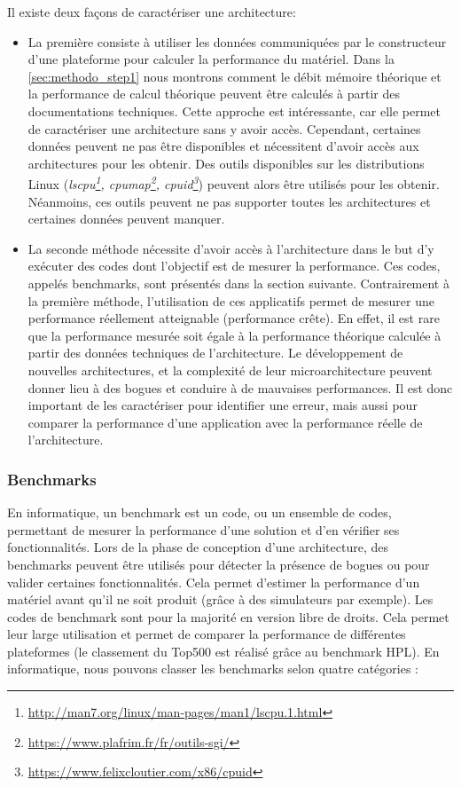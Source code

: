     Il existe deux façons de caractériser une architecture: 
    \begin{itemize}
        \item La première consiste à utiliser les données communiquées par le constructeur d'une plateforme pour calculer la performance du matériel. Dans la \autoref{sec:methodo_step1} nous montrons comment le débit mémoire théorique et la performance de calcul théorique peuvent être calculés à partir des documentations techniques. Cette approche est intéressante, car elle permet de caractériser une architecture sans y avoir accès. Cependant, certaines données peuvent ne pas être disponibles et nécessitent d'avoir accès aux architectures pour les obtenir. Des outils disponibles sur les distributions Linux (\textit{lscpu\footnote{\url{http://man7.org/linux/man-pages/man1/lscpu.1.html}}, cpumap\footnote{\url{https://www.plafrim.fr/fr/outils-sgi/}}, cpuid\footnote{\url{https://www.felixcloutier.com/x86/cpuid}}}) peuvent alors être utilisés pour les obtenir. Néanmoins, ces outils peuvent ne pas supporter toutes les architectures et certaines données peuvent manquer.
    
        \item La seconde méthode nécessite d'avoir accès à l'architecture dans le but d'y exécuter des codes dont l'objectif est de mesurer la performance. Ces codes, appelés \glspl{benchmark}, sont présentés dans la section suivante. Contrairement à la première méthode, l'utilisation de ces applicatifs permet de mesurer une performance réellement atteignable (performance crête). En effet, il est rare que la performance mesurée soit égale à la performance théorique calculée à partir des données techniques de l'architecture. Le développement de nouvelles architectures, et la complexité de leur microarchitecture peuvent donner lieu à des bogues et conduire à de mauvaises performances. Il est donc important de les caractériser pour identifier une erreur, mais aussi pour comparer la performance d'une application avec la performance réelle de l'architecture.
    \end{itemize}
    
           
    \subsubsection{Benchmarks}
           
        En informatique, un \gls{benchmark} est un code, ou un ensemble de codes, permettant de mesurer la performance d'une solution et d'en vérifier ses fonctionnalités. Lors de la phase de conception d'une architecture, des benchmarks peuvent être utilisés pour détecter la présence de bogues ou pour valider certaines fonctionnalités. Cela permet d'estimer la performance d'un matériel avant qu'il ne soit produit (grâce à des simulateurs par exemple). Les codes de benchmark sont pour la majorité en version libre de droits. Cela permet leur large utilisation et permet de comparer la performance de différentes plateformes (le classement du Top500 est réalisé grâce au benchmark HPL). En informatique, nous pouvons classer les benchmarks selon quatre catégories \cite{Staelin2004}:
        

